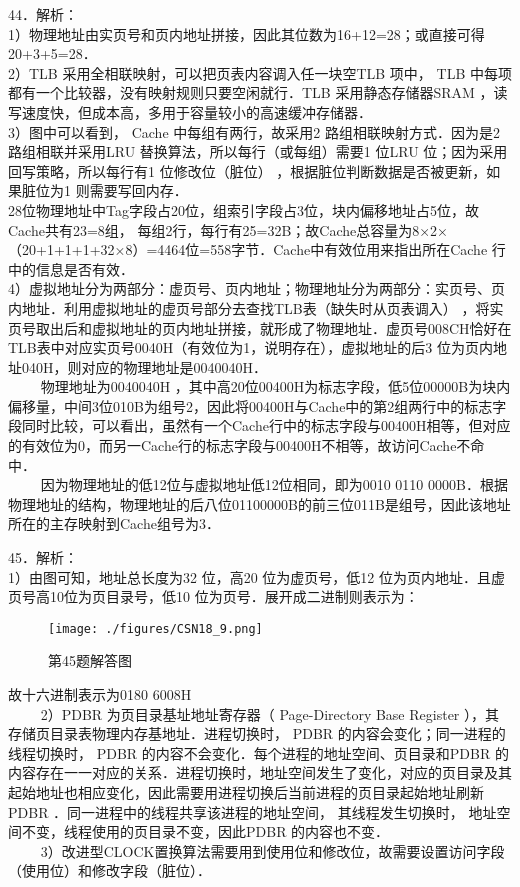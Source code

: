 44．解析： \\
1）物理地址由实页号和页内地址拼接，因此其位数为16+12=28；或直接可得20+3+5=28． \\
2）TLB 采用全相联映射，可以把页表内容调入任一块空TLB 项中， TLB 中每项都有一个比较器，没有映射规则只要空闲就行．TLB 采用静态存储器SRAM ，读写速度快，但成本高，多用于容量较小的高速缓冲存储器． \\
3）图中可以看到， Cache 中每组有两行，故采用2 路组相联映射方式．因为是2 路组相联并采用LRU 替换算法，所以每行（或每组）需要1 位LRU 位；因为采用回写策略，所以每行有1 位修改位（脏位） ，根据脏位判断数据是否被更新，如果脏位为1 则需要写回内存． \\
28位物理地址中Tag字段占20位，组索引字段占3位，块内偏移地址占5位，故Cache共有23=8组， 每组2行，每行有25=32B；故Cache总容量为8×2×（20+1+1+1+32×8）=4464位=558字节．Cache中有效位用来指出所在Cache 行中的信息是否有效． \\
4）虚拟地址分为两部分：虚页号、页内地址；物理地址分为两部分：实页号、页内地址．利用虚拟地址的虚页号部分去查找TLB表（缺失时从页表调入） ，将实页号取出后和虚拟地址的页内地址拼接，就形成了物理地址．虚页号008CH恰好在TLB表中对应实页号0040H（有效位为1，说明存在），虚拟地址的后3 位为页内地址040H，则对应的物理地址是0040040H． \\
$\qquad$ 物理地址为0040040H ，其中高20位00400H为标志字段，低5位00000B为块内偏移量，中间3位010B为组号2，因此将00400H与Cache中的第2组两行中的标志字段同时比较，可以看出，虽然有一个Cache行中的标志字段与00400H相等，但对应的有效位为0，而另一Cache行的标志字段与00400H不相等，故访问Cache不命中． \\
$\qquad$ 因为物理地址的低12位与虚拟地址低12位相同，即为0010 0110 0000B．根据物理地址的结构，物理地址的后八位01100000B的前三位011B是组号，因此该地址所在的主存映射到Cache组号为3．

45．解析： \\
1）由图可知，地址总长度为32 位，高20 位为虚页号，低12 位为页内地址．且虚页号高10位为页目录号，低10 位为页号．展开成二进制则表示为： \\
\begin{figure}[ht]
\centering
\texttt{[image: ./figures/CSN18\_9.png]}
\caption{第45题解答图} \label{CSN18_fig9}
\end{figure}
故十六进制表示为0180 6008H \\
$\qquad$ 2）PDBR 为页目录基址地址寄存器（ Page-Directory Base Register ），其存储页目录表物理内存基地址．进程切换时， PDBR 的内容会变化；同一进程的线程切换时， PDBR 的内容不会变化．每个进程的地址空间、页目录和PDBR 的内容存在一一对应的关系．进程切换时，地址空间发生了变化，对应的页目录及其起始地址也相应变化，因此需要用进程切换后当前进程的页目录起始地址刷新PDBR ．同一进程中的线程共享该进程的地址空间， 其线程发生切换时， 地址空间不变，线程使用的页目录不变，因此PDBR 的内容也不变． \\
$\qquad$ 3）改进型CLOCK置换算法需要用到使用位和修改位，故需要设置访问字段（使用位）和修改字段（脏位）．

